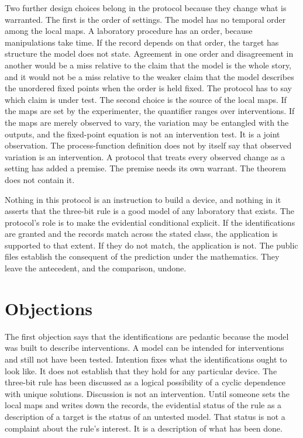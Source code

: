 \documentclass[11pt]{article}
\begin{document}
Two further design choices belong in the protocol because they change what is warranted. The first is the order of settings. The model has no temporal order among the local maps. A laboratory procedure has an order, because manipulations take time. If the record depends on that order, the target has structure the model does not state. Agreement in one order and disagreement in another would be a miss relative to the claim that the model is the whole story, and it would not be a miss relative to the weaker claim that the model describes the unordered fixed points when the order is held fixed. The protocol has to say which claim is under test. The second choice is the source of the local maps. If the maps are set by the experimenter, the quantifier ranges over interventions. If the maps are merely observed to vary, the variation may be entangled with the outputs, and the fixed-point equation is not an intervention test. It is a joint observation. The process-function definition does not by itself say that observed variation is an intervention. A protocol that treats every observed change as a setting has added a premise. The premise needs its own warrant. The theorem does not contain it.

Nothing in this protocol is an instruction to build a device, and nothing in it asserts that the three-bit rule is a good model of any laboratory that exists. The protocol's role is to make the evidential conditional explicit. If the identifications are granted and the records match across the stated class, the application is supported to that extent. If they do not match, the application is not. The public files establish the consequent of the prediction under the mathematics. They leave the antecedent, and the comparison, undone.

\section{Objections}
\label{sec:obj}

The first objection says that the identifications are pedantic because the model was built to describe interventions. A model can be intended for interventions and still not have been tested. Intention fixes what the identifications ought to look like. It does not establish that they hold for any particular device. The three-bit rule has been discussed as a logical possibility of a cyclic dependence with unique solutions. Discussion is not an intervention. Until someone sets the local maps and writes down the records, the evidential status of the rule as a description of a target is the status of an untested model. That status is not a complaint about the rule's interest. It is a description of what has been done.
\end{document}
